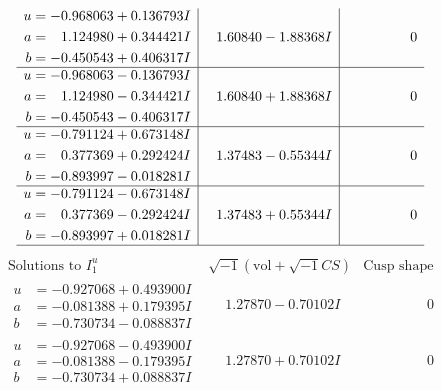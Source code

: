\documentclass[1p]{elsarticle_modified}
\theoremstyle{definition}
\newcommand{\I}{\sqrt{-1}}
\begin{document}
$$\begin{array}{c|c|c}
\begin{aligned}
u &= -0.968063 + 0.136793 I \\
a &= \phantom{-}1.124980 + 0.344421 I \\
b &= -0.450543 + 0.406317 I\end{aligned}
 & \phantom{-}1.60840 - 1.88368 I & \phantom{-0.000000 } 0 \\ \hline\begin{aligned}
u &= -0.968063 - 0.136793 I \\
a &= \phantom{-}1.124980 - 0.344421 I \\
b &= -0.450543 - 0.406317 I\end{aligned}
 & \phantom{-}1.60840 + 1.88368 I & \phantom{-0.000000 } 0 \\ \hline\begin{aligned}
u &= -0.791124 + 0.673148 I \\
a &= \phantom{-}0.377369 + 0.292424 I \\
b &= -0.893997 - 0.018281 I\end{aligned}
 & \phantom{-}1.37483 - 0.55344 I & \phantom{-0.000000 } 0 \\ \hline\begin{aligned}
u &= -0.791124 - 0.673148 I \\
a &= \phantom{-}0.377369 - 0.292424 I \\
b &= -0.893997 + 0.018281 I\end{aligned}
 & \phantom{-}1.37483 + 0.55344 I & \phantom{-0.000000 } 0\\
 \hline 
 \end{array}$$\newpage$$\begin{array}{c|c|c}  
\text{Solutions to }I^u_{1}& \I (\text{vol} + \sqrt{-1}CS) & \text{Cusp shape}\\
 \hline 
\begin{aligned}
u &= -0.927068 + 0.493900 I \\
a &= -0.081388 + 0.179395 I \\
b &= -0.730734 - 0.088837 I\end{aligned}
 & \phantom{-}1.27870 - 0.70102 I & \phantom{-0.000000 } 0 \\ \hline\begin{aligned}
u &= -0.927068 - 0.493900 I \\
a &= -0.081388 - 0.179395 I \\
b &= -0.730734 + 0.088837 I\end{aligned}
 & \phantom{-}1.27870 + 0.70102 I & \phantom{-0.000000 } 0 \\ \hline\begin{aligned}

\end{aligned}
\end{array}$$
\end{document}

